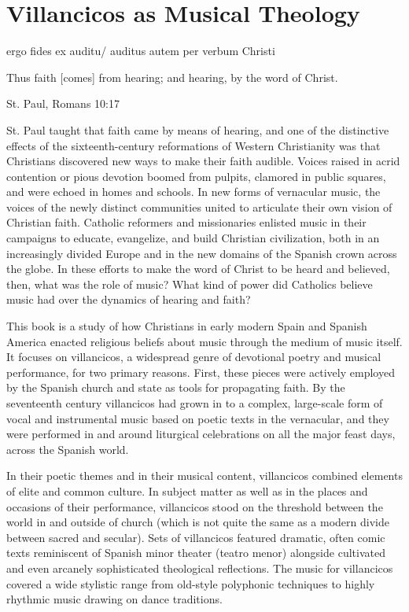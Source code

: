 \documentclass{memoir}
\begin{document}
{    \mainmatter
    
    \chapter{Villancicos as Musical Theology}
    \label{chapter:intro}
    
	  ergo fides ex auditu/ auditus autem per verbum Christi
	
	Thus faith [comes] from hearing; and hearing, by the word of Christ.
      
	St. Paul, Romans 10:17
      
    St. Paul taught that faith came by means of hearing, and one of the distinctive effects of the sixteenth-century reformations of Western Christianity was that Christians discovered new ways to make their faith audible.
    Voices raised in acrid contention or pious devotion boomed from pulpits, clamored in public squares, and were echoed in homes and schools.
    In new forms of vernacular music, the voices of the newly distinct communities united to articulate their own vision of Christian faith.
    Catholic reformers and missionaries enlisted music in their campaigns to educate, evangelize, and build Christian civilization, both in an increasingly divided Europe and in the new domains of the Spanish crown across the globe. 
    In these efforts to make the word of Christ to be heard and believed, then, what was the role of music?
    What kind of power did Catholics believe music had over the dynamics of hearing and faith?
  
    This book is a study of how Christians in early modern Spain and Spanish America enacted religious beliefs about music through the medium of music itself.
    It focuses on villancicos, a widespread genre of devotional poetry and musical performance, for two primary reasons.
    First, these pieces were actively employed by the Spanish church and state as tools for propagating faith.
    By the seventeenth century villancicos had grown in to a complex, large-scale form of vocal and instrumental music based on poetic texts in the vernacular, and they were performed in and around liturgical celebrations on all the major feast days, across the Spanish world.
  
    In their poetic themes and in their musical content, villancicos combined elements of elite and common culture. 
    In subject matter as well as in the places and occasions of their performance, villancicos stood on the threshold between the world in and outside of church (which is not quite the same as a modern divide between sacred and secular). 
    Sets of villancicos featured dramatic, often comic texts reminiscent of Spanish minor theater (teatro menor) alongside cultivated and even arcanely sophisticated theological reflections.
    The music for villancicos covered a wide stylistic range from old-style polyphonic techniques to highly rhythmic music drawing on dance traditions.
  
}
\end{document}
